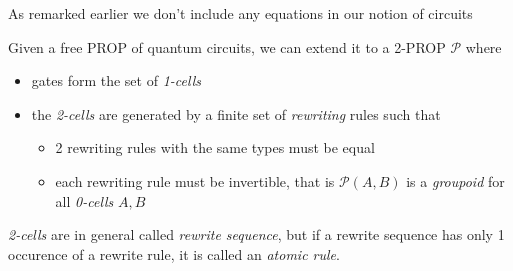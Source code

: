 \documentclass[a4paper]{article}
\begin{document}
As remarked earlier we don't include any equations in our notion of
circuits 

\begin{definition}
  Given a free PROP of quantum circuits, we can extend it to a 2-PROP
    $\mathcal{P}$ where
  \begin{itemize}
    \item gates form the set of \emph{1-cells} 
    \item the \emph{2-cells} are generated by a finite set of \emph{rewriting}
      rules such that
    \begin{itemize}
      \item 2 rewriting rules with the same types must be equal
      \item each rewriting rule must be invertible, that is $\mathcal{P}(A, B)$
        is a \emph{groupoid} for all \emph{0-cells} $A, B$
    \end{itemize}
  \end{itemize}
  
  \emph{2-cells} are in general called \emph{rewrite sequence}, but if a rewrite
    sequence has only 1 occurence of a rewrite rule, it is called an
    \emph{atomic rule}.
\end{definition}
\end{document}

